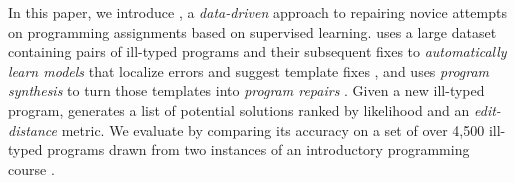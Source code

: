 In this paper, we introduce \toolname, a \emph{data-driven} approach to
repairing novice attempts on programming assignments based on supervised
learning. \toolname uses a large dataset containing pairs of ill-typed
programs  and
their subsequent fixes to \emph{automatically learn models} that localize
errors and suggest template fixes , and uses
\emph{program synthesis} to turn those
templates into \emph{program repairs} . Given a new ill-typed program, \toolname generates a list of
potential solutions ranked by likelihood and an \emph{edit-distance}
metric. We evaluate \toolname by comparing its accuracy on a set of over
4,500 ill-typed \ocaml programs drawn from two instances of an introductory
programming course .







